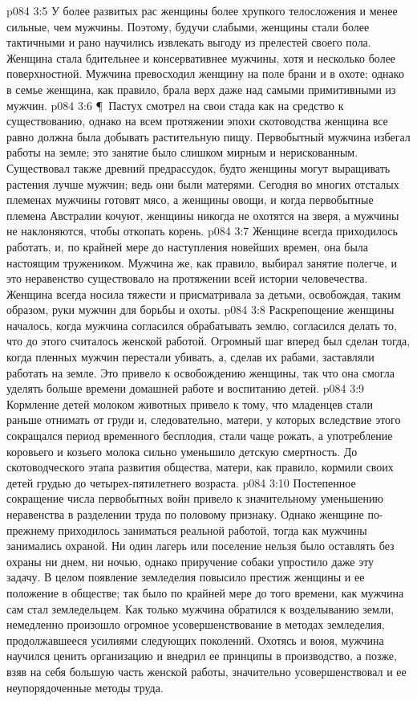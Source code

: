 \vs p084 3:5 У более развитых рас женщины более хрупкого телосложения и менее сильные, чем мужчины. Поэтому, будучи слабыми, женщины стали более тактичными и рано научились извлекать выгоду из прелестей своего пола. Женщина стала бдительнее и консервативнее мужчины, хотя и несколько более поверхностной. Мужчина превосходил женщину на поле брани и в охоте; однако в семье женщина, как правило, брала верх даже над самыми примитивными из мужчин.
\vs p084 3:6 \P\ Пастух смотрел на свои стада как на средство к существованию, однако на всем протяжении эпохи скотоводства женщина все равно должна была добывать растительную пищу. Первобытный мужчина избегал работы на земле; это занятие было слишком мирным и нерискованным. Существовал также древний предрассудок, будто женщины могут выращивать растения лучше мужчин; ведь они были матерями. Сегодня во многих отсталых племенах мужчины готовят мясо, а женщины овощи, и когда первобытные племена Австралии кочуют, женщины никогда не охотятся на зверя, а мужчины не наклоняются, чтобы откопать корень.
\vs p084 3:7 Женщине всегда приходилось работать, и, по крайней мере до наступления новейших времен, она была настоящим тружеником. Мужчина же, как правило, выбирал занятие полегче, и это неравенство существовало на протяжении всей истории человечества. Женщина всегда носила тяжести и присматривала за детьми, освобождая, таким образом, руки мужчин для борьбы и охоты.
\vs p084 3:8 Раскрепощение женщины началось, когда мужчина согласился обрабатывать землю, согласился делать то, что до этого считалось женской работой. Огромный шаг вперед был сделан тогда, когда пленных мужчин перестали убивать, а, сделав их рабами, заставляли работать на земле. Это привело к освобождению женщины, так что она смогла уделять больше времени домашней работе и воспитанию детей.
\vs p084 3:9 Кормление детей молоком животных привело к тому, что младенцев стали раньше отнимать от груди и, следовательно, матери, у которых вследствие этого сокращался период временного бесплодия, стали чаще рожать, а употребление коровьего и козьего молока сильно уменьшило детскую смертность. До скотоводческого этапа развития общества, матери, как правило, кормили своих детей грудью до четырех\hyp{}пятилетнего возраста.
\vs p084 3:10 Постепенное сокращение числа первобытных войн привело к значительному уменьшению неравенства в разделении труда по половому признаку. Однако женщине по\hyp{}прежнему приходилось заниматься реальной работой, тогда как мужчины занимались охраной. Ни один лагерь или поселение нельзя было оставлять без охраны ни днем, ни ночью, однако приручение собаки упростило даже эту задачу. В целом появление земледелия повысило престиж женщины и ее положение в обществе; так было по крайней мере до того времени, как мужчина сам стал земледельцем. Как только мужчина обратился к возделыванию земли, немедленно произошло огромное усовершенствование в методах земледелия, продолжавшееся усилиями следующих поколений. Охотясь и воюя, мужчина научился ценить организацию и внедрил ее принципы в производство, а позже, взяв на себя большую часть женской работы, значительно усовершенствовал и ее неупорядоченные методы труда.
